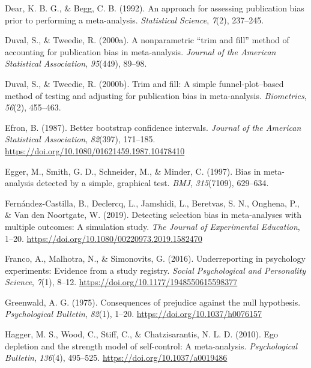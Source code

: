 \documentclass[
  man, donotrepeattitle,floatsintext]{apa7}
\newlength{\cslhangindent}
\newenvironment{CSLReferences}[2] %
 {\begin{list}{}{%
  \setlength{\itemindent}{0pt}
  \setlength{\leftmargin}{0pt}
  \setlength{\parsep}{0pt}
  \ifodd #1
   \setlength{\leftmargin}{\cslhangindent}
   \setlength{\itemindent}{-1\cslhangindent}
  \fi
  \setlength{\itemsep}{#2\baselineskip}}}
 {\end{list}}
\begin{document}
\begin{CSLReferences}{1}{0}
Dear, K. B. G., \& Begg, C. B. (1992). {An approach for assessing publication bias prior to performing a meta-analysis}. \emph{Statistical Science}, \emph{7}(2), 237--245.

Duval, S., \& Tweedie, R. (2000a). A nonparametric {``trim and fill''} method of accounting for publication bias in meta-analysis. \emph{Journal of the American Statistical Association}, \emph{95}(449), 89--98.

Duval, S., \& Tweedie, R. (2000b). Trim and fill: A simple funnel-plot--based method of testing and adjusting for publication bias in meta-analysis. \emph{Biometrics}, \emph{56}(2), 455--463.

Efron, B. (1987). Better bootstrap confidence intervals. \emph{Journal of the American Statistical Association}, \emph{82}(397), 171--185. \url{https://doi.org/10.1080/01621459.1987.10478410}

Egger, M., Smith, G. D., Schneider, M., \& Minder, C. (1997). Bias in meta-analysis detected by a simple, graphical test. \emph{BMJ}, \emph{315}(7109), 629--634.

Fernández-Castilla, B., Declercq, L., Jamshidi, L., Beretvas, S. N., Onghena, P., \& Van den Noortgate, W. (2019). Detecting selection bias in meta-analyses with multiple outcomes: A simulation study. \emph{The Journal of Experimental Education}, 1--20. \url{https://doi.org/10.1080/00220973.2019.1582470}

Franco, A., Malhotra, N., \& Simonovits, G. (2016). Underreporting in psychology experiments: Evidence from a study registry. \emph{Social Psychological and Personality Science}, \emph{7}(1), 8--12. \url{https://doi.org/10.1177/1948550615598377}

Greenwald, A. G. (1975). Consequences of prejudice against the null hypothesis. \emph{Psychological Bulletin}, \emph{82}(1), 1--20. \url{https://doi.org/10.1037/h0076157}

Hagger, M. S., Wood, C., Stiff, C., \& Chatzisarantis, N. L. D. (2010). Ego depletion and the strength model of self-control: {A} meta-analysis. \emph{Psychological Bulletin}, \emph{136}(4), 495--525. \url{https://doi.org/10.1037/a0019486}


\end{CSLReferences}
\end{document}
